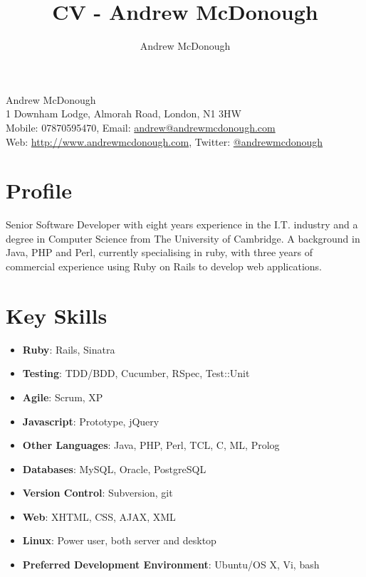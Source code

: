 \documentclass[a4paper,12pt]{article}
\begin{document}
\title{CV - Andrew McDonough}
\author{Andrew McDonough}

\begin{center}
  {\huge Andrew McDonough} \\[\baselineskip]
  1 Downham Lodge, Almorah Road, London,  N1 3HW \\
  Mobile: 07870595470, Email: \href{mailto:andrew@andrewmcdonough.com}{andrew@andrewmcdonough.com} \\
  Web: \url{http://www.andrewmcdonough.com}, Twitter: \href{http://twitter.com/andrewmcdonough}{@andrewmcdonough} \\
\end{center}


\section*{Profile}
Senior Software Developer with eight years experience in the I.T. industry and a degree in Computer Science from The University of Cambridge.  A background in Java, PHP and Perl, currently specialising in ruby, with three years of commercial experience using Ruby on Rails to develop web applications.

\section*{Key Skills}
\begin{itemize}
  \setlength{\itemsep}{1pt}
  \setlength{\parskip}{0pt}
  \setlength{\parsep}{0pt}
  \item \textbf{Ruby}: Rails, Sinatra
  \item \textbf{Testing}: TDD/BDD, Cucumber, RSpec, Test::Unit
  \item \textbf{Agile}: Scrum, XP
  \item \textbf{Javascript}: Prototype, jQuery 
  \item \textbf{Other Languages}: Java, PHP, Perl, TCL, C, ML, Prolog
  \item \textbf{Databases}: MySQL, Oracle, PostgreSQL
  \item \textbf{Version Control}: Subversion, git
  \item \textbf{Web}: XHTML, CSS, AJAX, XML
  \item \textbf{Linux}: Power user, both server and desktop
  \item \textbf{Preferred Development Environment}: Ubuntu/OS X, Vi, bash
 \end{itemize}
\end{document}
